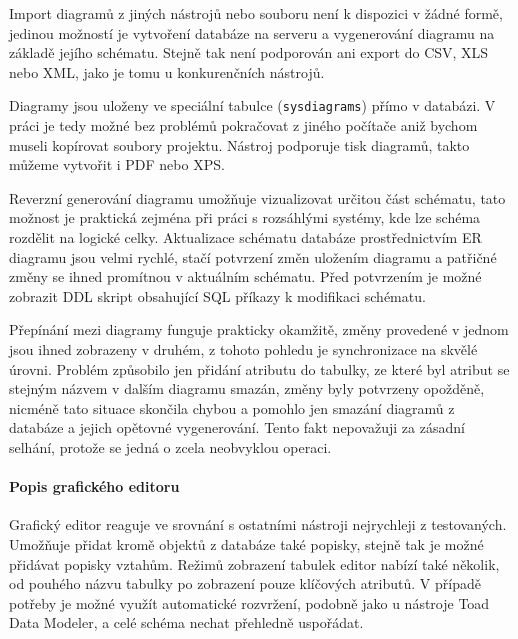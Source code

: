 \documentclass[czech,bachelor,public,dept460,male,oneside]{diploma}
\begin{document}
		Import diagramů z jiných nástrojů nebo souboru není k dispozici v žádné formě, jedinou možností je vytvoření databáze na serveru a vygenerování diagramu na základě jejího schématu. Stejně tak není podporován ani export do CSV, XLS nebo XML, jako je tomu u konkurenčních nástrojů. 
		
		Diagramy jsou uloženy ve speciální tabulce (\texttt{sysdiagrams}) přímo v databázi. V práci je tedy možné bez problémů pokračovat z jiného počítače aniž bychom museli kopírovat soubory projektu. Nástroj podporuje tisk diagramů, takto můžeme vytvořit i PDF nebo XPS.
		
		Reverzní generování diagramu umožňuje vizualizovat určitou část schématu, tato možnost je praktická zejména při práci s rozsáhlými systémy, kde lze schéma rozdělit na logické celky. Aktualizace schématu databáze prostřednictvím ER diagramu jsou velmi rychlé, stačí potvrzení změn uložením diagramu a patřičné změny se ihned promítnou v aktuálním schématu. Před potvrzením je možné zobrazit DDL skript obsahující SQL příkazy k modifikaci schématu. 
		
		Přepínání mezi diagramy funguje prakticky okamžitě, změny provedené v jednom jsou ihned zobrazeny v druhém, z tohoto pohledu je synchronizace na skvělé úrovni. Problém způsobilo jen přidání atributu do tabulky, ze které byl atribut se stejným názvem v dalším diagramu smazán, změny byly potvrzeny opožděně, nicméně tato situace skončila chybou a pomohlo jen smazání diagramů z databáze a jejich opětovné vygenerování. Tento fakt nepovažuji za zásadní selhání, protože se jedná o zcela neobvyklou operaci.
		
		
		\paragraph{Popis grafického editoru}
		Grafický editor reaguje ve srovnání s ostatními nástroji nejrychleji z testovaných. Umožňuje přidat kromě objektů z databáze také popisky, stejně tak je možné přidávat popisky vztahům. Režimů zobrazení tabulek editor nabízí také několik, od pouhého názvu tabulky po zobrazení pouze klíčových atributů. V případě potřeby je možné využít automatické rozvržení, podobně jako u nástroje Toad Data Modeler, a celé schéma nechat přehledně uspořádat. 
		
\end{document}
